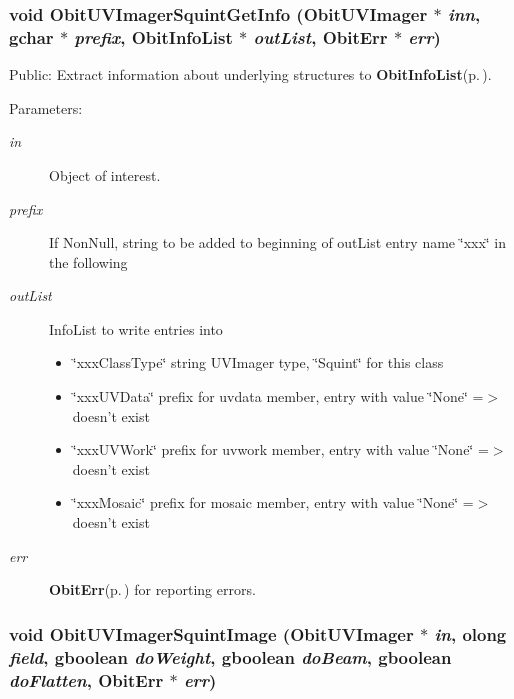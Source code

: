 \subsubsection{\setlength{\rightskip}{0pt plus 5cm}void Obit\-UVImager\-Squint\-Get\-Info ({\bf Obit\-UVImager} $\ast$ {\em inn}, gchar $\ast$ {\em prefix}, {\bf Obit\-Info\-List} $\ast$ {\em out\-List}, {\bf Obit\-Err} $\ast$ {\em err})}\label{ObitUVImagerSquint_8h_a13}


Public: Extract information about underlying structures to {\bf Obit\-Info\-List}{\rm (p.\,\pageref{structObitInfoList})}. 

\begin{Desc}
\item[Parameters:]
\begin{description}
\item[{\em in}]Object of interest. \item[{\em prefix}]If Non\-Null, string to be added to beginning of out\-List entry name \char`\"{}xxx\char`\"{} in the following \item[{\em out\-List}]Info\-List to write entries into \begin{itemize}
\item \char`\"{}xxx\-Class\-Type\char`\"{} string UVImager type, \char`\"{}Squint\char`\"{} for this class \item \char`\"{}xxx\-UVData\char`\"{} prefix for uvdata member, entry with value \char`\"{}None\char`\"{} =$>$ doesn't exist \item \char`\"{}xxx\-UVWork\char`\"{} prefix for uvwork member, entry with value \char`\"{}None\char`\"{} =$>$ doesn't exist \item \char`\"{}xxx\-Mosaic\char`\"{} prefix for mosaic member, entry with value \char`\"{}None\char`\"{} =$>$ doesn't exist \end{itemize}
\item[{\em err}]{\bf Obit\-Err}{\rm (p.\,\pageref{structObitErr})} for reporting errors. \end{description}
\end{Desc}
\subsubsection{\setlength{\rightskip}{0pt plus 5cm}void Obit\-UVImager\-Squint\-Image ({\bf Obit\-UVImager} $\ast$ {\em in}, {\bf olong} {\em field}, gboolean {\em do\-Weight}, gboolean {\em do\-Beam}, gboolean {\em do\-Flatten}, {\bf Obit\-Err} $\ast$ {\em err})}\label{ObitUVImagerSquint_8h_a12}


